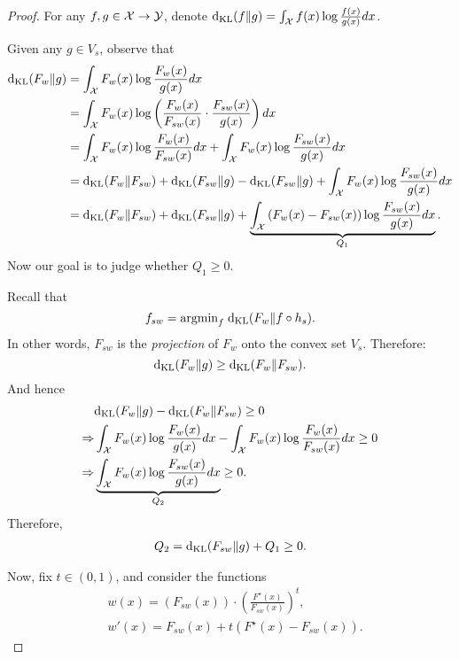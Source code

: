 \begin{proof}

For any $f,g \in \mathcal{X} \to \mathcal{Y}$, denote $ \mathrm{d}_{\mathrm{KL}}(f \| g) = \int_{\mathcal{X}} f(x) \log \frac{f(x)}{g(x)} d x$.

Given any $g \in V_s$, observe that
\begin{align} \label{eqn:square-expansion}
    \mathrm{d}_{\mathrm{KL}}(F_w \| g) &= \int_{\mathcal{X}} F_w(x) \log \frac{F_w(x)}{g(x)} d x \nonumber \\
    &= \int_{\mathcal{X}} F_w(x) \log \left( \frac{F_w(x)}{F_{sw}(x)} \cdot \frac{F_{sw}(x)}{g(x)} \right) d x \nonumber \\
    &= \int_{\mathcal{X}} F_w(x) \log  \frac{F_w(x)}{F_{sw}(x)} d x + \int_{\mathcal{X}} F_w(x) \log  \frac{F_{sw}(x)}{g(x)} d x \nonumber \\
    &=\mathrm{d}_{\mathrm{KL}}(F_w \| F_{sw}) + \mathrm{d}_{\mathrm{KL}}(F_{sw} \| g) - \mathrm{d}_{\mathrm{KL}}(F_{sw} \| g) + \int_{\mathcal{X}} F_w(x) \log  \frac{F_{sw}(x)}{g(x)} d x \nonumber \\
    &=\mathrm{d}_{\mathrm{KL}}(F_w \| F_{sw}) + \mathrm{d}_{\mathrm{KL}}(F_{sw} \| g) + \underbrace{\int_{\mathcal{X}} \left( F_w(x) - F_{sw}(x) \right) \log  \frac{F_{sw}(x)}{g(x)} d x}_{Q_1}.
\end{align}
Now our goal is to judge whether $Q_1 \ge 0$.

Recall that $$f_{sw} = \text{argmin}_{f}\; \mathrm{d}_{\mathrm{KL}}(F_w \| f \circ h_s).$$
In other words, $F_{sw}$ is the \textit{projection} of $F_w$ onto the convex set $V_s$. 
Therefore:
$$\mathrm{d}_{\mathrm{KL}}(F_w \| g) \ge \mathrm{d}_{\mathrm{KL}}(F_w \| F_{sw}).$$
And hence
\begin{align}
    & \mathrm{d}_{\mathrm{KL}}(F_w \| g) - \mathrm{d}_{\mathrm{KL}}(F_w \| F_{sw}) \ge 0 
    \nonumber \\ \Rightarrow & \int_{\mathcal{X}} F_w(x) \log  \frac{F_w(x)}{g(x)} d x - \int_{\mathcal{X}} F_w(x) \log \frac{F_w(x)}{F_{sw}(x)} d x \ge 0 
    \nonumber \\ \Rightarrow & \underbrace{\int_{\mathcal{X}} F_w(x) \log \frac{F_{sw}(x)}{g(x)} d x}_{Q_2} \ge 0. \nonumber
\end{align}
Therefore, 
\begin{align}
Q_2 = \mathrm{d}_{\mathrm{KL}}(F_{sw} \| g) + Q_1 
\ge 0. \label{eqn:cross-term-inequality-1}
\end{align}


Now, fix $t \in (0,1)$, and consider the functions 
\begin{align} 
& w(x) = (F_{sw}(x)) \cdot \left(\frac{F^\star(x)}{F_{sw}(x)} \right)^t, \label{eq:def_w_t} \\
& w'(x)= F_{sw}(x) + t\left( F^\star(x) - F_{sw}(x) \right).\label{eq:def_w'_t}
\end{align}


\end{proof}
